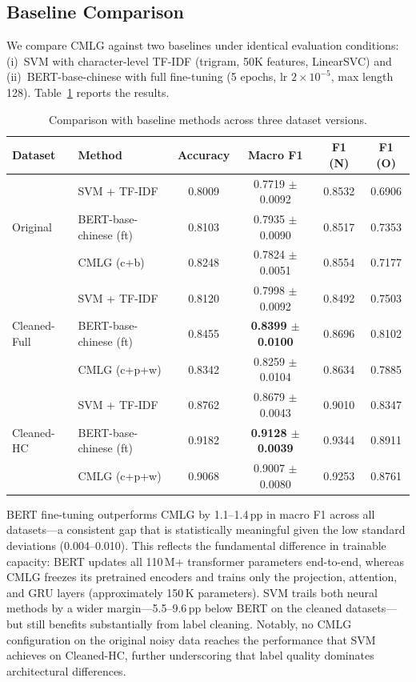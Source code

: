 ﻿\documentclass[12pt]{article}
\begin{document}
\subsection{Baseline Comparison}

We compare CMLG against two baselines under identical evaluation conditions: (i)~SVM with character-level TF-IDF (trigram, 50K features, LinearSVC) and (ii)~BERT-base-chinese with full fine-tuning (5 epochs, lr $2\times10^{-5}$, max length 128). Table~\ref{tab:baselines} reports the results.

\begin{table}[htbp]
\centering
\caption{Comparison with baseline methods across three dataset versions.}
\label{tab:baselines}
\begin{tabular}{llcccc}
\toprule
Dataset & Method & Accuracy & Macro F1 & F1 (N) & F1 (O) \\
\midrule
\multirow{3}{*}{Original}
& SVM + TF-IDF          & 0.8009 & 0.7719 $\pm$ 0.0092 & 0.8532 & 0.6906 \\
& BERT-base-chinese (ft) & 0.8103 & 0.7935 $\pm$ 0.0090 & 0.8517 & 0.7353 \\
& CMLG (c+b)            & 0.8248 & 0.7824 $\pm$ 0.0051 & 0.8554 & 0.7177 \\
\midrule
\multirow{3}{*}{Cleaned-Full}
& SVM + TF-IDF          & 0.8120 & 0.7998 $\pm$ 0.0092 & 0.8492 & 0.7503 \\
& BERT-base-chinese (ft) & 0.8455 & \textbf{0.8399 $\pm$ 0.0100} & 0.8696 & 0.8102 \\
& CMLG (c+p+w)          & 0.8342 & 0.8259 $\pm$ 0.0104 & 0.8634 & 0.7885 \\
\midrule
\multirow{3}{*}{Cleaned-HC}
& SVM + TF-IDF          & 0.8762 & 0.8679 $\pm$ 0.0043 & 0.9010 & 0.8347 \\
& BERT-base-chinese (ft) & 0.9182 & \textbf{0.9128 $\pm$ 0.0039} & 0.9344 & 0.8911 \\
& CMLG (c+p+w)          & 0.9068 & 0.9007 $\pm$ 0.0080 & 0.9253 & 0.8761 \\
\bottomrule
\end{tabular}
\end{table}

BERT fine-tuning outperforms CMLG by 1.1--1.4\,pp in macro F1 across all datasets---a consistent gap that is statistically meaningful given the low standard deviations (0.004--0.010). This reflects the fundamental difference in trainable capacity: BERT updates all 110\,M+ transformer parameters end-to-end, whereas CMLG freezes its pretrained encoders and trains only the projection, attention, and GRU layers (approximately 150\,K parameters). SVM trails both neural methods by a wider margin---5.5--9.6\,pp below BERT on the cleaned datasets---but still benefits substantially from label cleaning. Notably, no CMLG configuration on the original noisy data reaches the performance that SVM achieves on Cleaned-HC, further underscoring that label quality dominates architectural differences.
\end{document}

